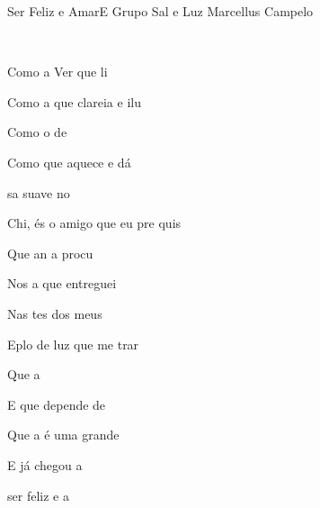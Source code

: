 \documentclass[a4,12pt,oneside]{book}
\newcommand{\RevDate}{\today}
\newcommand{\NotCCLIed}{\relax}
\begin{document}
\begin{song}{Ser Feliz e Amar}{E}
  {Grupo Sal e Luz}
  {Marcellus Campelo}
  {}
  {\NotCCLIed}
  
	\renewcommand{\RevDate}{24 de julho de 2014}

	
	\ifChordBk
		{\vspace{-1em}\flushright{\Achord  \quad \Aschord \quad \Fsusmchord \quad \Dchord \quad \Echord \quad \Eschord \quad \Dmchord
		
		~\\
		
		\Csusmchord}\\}
		\vspace{-2cm}
	\fi

	\begin{SBVerse*}
		Como a Ver que li
		
		Como a  que clareia e ilu
		
		Como o  de 
		
		Como  que aquece e dá 
		
		sa suave no  ~ 
		
		Chi, és o amigo que eu pre quis
		
		Que an a procu
		
		Nos  a que  entreguei
		
		Nas tes dos meus 
		
		Eplo de luz que  me trar ~ 
	\end{SBVerse*}		
		
	\begin{SBVerse*}		
		Que a  
		
		E que  depende de 
		
		Que a  é uma grande 
		
		E  já chegou a 
		
		 ser feliz  e a ~ 
	\end{SBVerse*}

	\ifChordBk	
	\newpage
	\fi

	\begin{SBVerse*}
	

\end{SBVerse*}
\end{song}
\end{document}
